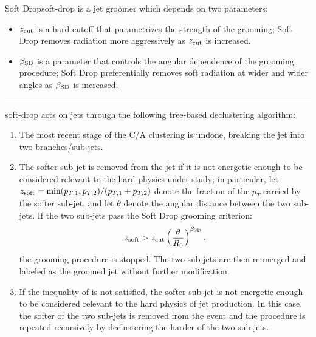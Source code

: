 \begin{definitionbox}{Soft Drop}{soft-drop}
     is a jet groomer which depends on two parameters:
    \begin{itemize}
        \item
            \(z_{\rm cut}\) is a hard cutoff that parametrizes the strength of the grooming;
            Soft Drop removes radiation more aggressively as \(z_{\rm cut}\) is increased.

        \item
            \(\mathbf{\beta_{\rm SD}}\) is a parameter that controls the angular dependence of the grooming procedure;
        Soft Drop preferentially removes soft radiation at wider and wider angles as \(\beta_{\rm SD}\) is increased.
    \end{itemize}

    \vspace{7pt}
    \hrule
    \vspace{7pt}

    \gls{soft-drop} acts on jets through the following tree-based \gls{declustering} algorithm:
    \begin{enumerate}
        \item
        \label{item:declustering}
        The most recent stage of the C/A clustering is undone, breaking the jet into two branches/sub-jets.

        \item
        The softer sub-jet is removed from the jet if it is not energetic enough to be considered relevant to the hard physics under study;
        in particular, let \(z_{\rm soft} = \min(p_{T,1}, p_{T,2})/(p_{T,1} + p_{T,2})\) denote the fraction of the \(p_T\) carried by the softer sub-jet, and let \(\theta\) denote the angular distance between the two sub-jets.
        If the two sub-jets pass the Soft Drop grooming criterion:
         \begin{align}
            \label{eq:softdropcriterion}
            z_{\rm soft} > \zcut \left(\frac{\theta}{R_0}\right)^{\beta_{\rm SD}}
            ,
        \end{align}
        the grooming procedure is stopped.
        The two sub-jets are then re-merged and labeled as the groomed jet without further modification.

        \item
        If the inequality of  is not satisfied, the softer sub-jet is not energetic enough to be considered relevant to the hard physics of jet production.
        In this case, the softer of the two sub-jets is removed from the event and the procedure is repeated recursively by \gls{declustering} the harder of the two sub-jets.
    \end{enumerate}
\end{definitionbox}

